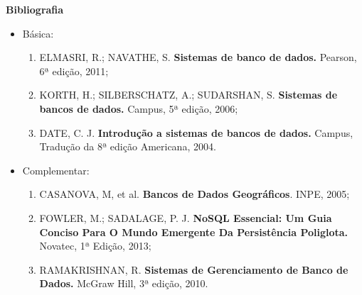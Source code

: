 



\begin{snugshade}\begin{center}\textbf{
    Bibliografia
}\end{center}\end{snugshade}

\begin{itemize} 
  \item Básica:
	\begin{enumerate}
	\item 	ELMASRI, R.; NAVATHE, S. \textbf{Sistemas de banco de dados.} Pearson, 6ª edição, 2011;
	\item 	KORTH, H.; SILBERSCHATZ, A.; SUDARSHAN, S. \textbf{Sistemas de bancos de dados.} Campus, 5ª edição, 2006;
	\item 	DATE, C. J. \textbf{Introdução a sistemas de bancos de dados.} Campus, Tradução da 8ª edição Americana, 2004.
	\end{enumerate}
  \item Complementar:
	\begin{enumerate} 
	\item 	CASANOVA, M, et al. \textbf{Bancos de Dados Geográficos}. INPE, 2005; 
	\item 	FOWLER, M.; SADALAGE, P. J. \textbf{NoSQL Essencial: Um Guia Conciso Para O Mundo Emergente Da Persistência Poliglota.} Novatec, 1ª Edição, 2013;
	\item 	RAMAKRISHNAN, R. \textbf{Sistemas de Gerenciamento de Banco de Dados.} McGraw Hill, 3ª edição, 2010.
	\end{enumerate}
\end{itemize}
